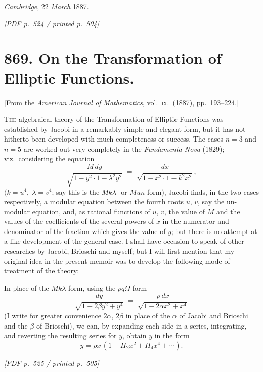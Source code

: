\documentclass[11pt]{article}
\begin{document}
\medskip

\noindent\textit{Cambridge}, 22 \textit{March} 1887.

\vfill
\noindent\textit{[PDF p.~524 / printed p.~504]}
\newpage

\section*{869. On the Transformation of Elliptic Functions.}

\begin{flushright}\small
[From the \textit{American Journal of Mathematics}, vol.~\textsc{ix}.\ (1887), pp.~193--224.]
\end{flushright}

\medskip

\noindent\textsc{The} algebraical theory of the Transformation of Elliptic Functions was established by Jacobi in a remarkably simple and elegant form, but it has not hitherto been developed with much completeness or success. The cases $n = 3$ and $n = 5$ are worked out very completely in the \textit{Fundamenta Nova} (1829); viz.\ considering the equation
\[
\frac{M\,dy}{\sqrt{1 - y^{2}\cdot 1 - \lambda^{2}y^{2}}}\;=\;\frac{dx}{\sqrt{1 - x^{2}\cdot 1 - k^{2}x^{2}}},
\]
$(k = u^{4},\;\lambda = v^{4}$; say this is the $M k \lambda$- or $Mun$-form), Jacobi finds, in the two cases respectively, a modular equation between the fourth roots $u$, $v$, say the un-modular equation, and, as rational functions of $u$, $v$, the value of $M$ and the values of the coefficients of the several powers of $x$ in the numerator and denominator of the fraction which gives the value of $y$; but there is no attempt at a like development of the general case. I shall have occasion to speak of other researches by Jacobi, Brioschi and myself; but I will first mention that my original idea in the present memoir was to develop the following mode of treatment of the theory:

In place of the $M k \lambda$-form, using the $\rho q\Omega$-form
\[
\frac{dy}{\sqrt{1 - 2\beta y^{2} + y^{4}}}\;=\;\frac{\rho\,dx}{\sqrt{1 - 2\alpha x^{2} + x^{4}}}
\]
(I write for greater convenience $2\alpha$, $2\beta$ in place of the $\alpha$ of Jacobi and Brioschi and the $\beta$ of Brioschi), we can, by expanding each side in a series, integrating, and reverting the resulting series for $y$, obtain $y$ in the form
\[
y = \rho x\,(1 + \Pi_{2}x^{2} + \Pi_{4}x^{4} + \cdots).
\]

\vfill
\noindent\textit{[PDF p.~525 / printed p.~505]}
\end{document}
